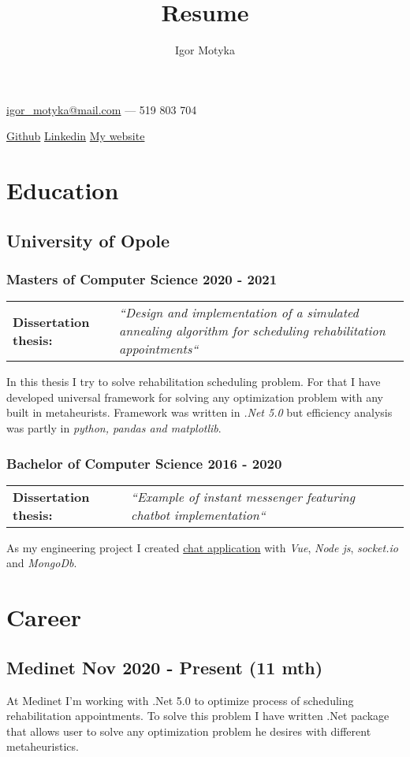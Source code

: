 \documentclass[10pt]{article}
\author{Igor Motyka}
\title{Resume}
\makeatletter
\renewcommand{\maketitle}{
 \begin{center}
    \huge\bfseries\theauthor
 \end{center}
 \begin{center}
    \href{mailto:igor_motyka@mail.com}{igor\_motyka@mail.com} --- 519 803 704 \\
 \end{center}
 \begin{center}
	 \href{https://github.com/Anav0}{Github} \hspace{0.7cm} \href{https://www.linkedin.com/in/igor-m-873439168/}{Linkedin} \hspace{0.7cm} \href{https://igormotyka.netlify.app/}{My website}
 \end{center}
 }
\makeatother
\begin{document}
\maketitle

\section{Education}
\subsection{University of Opole}
\subsubsection{Masters of Computer Science 2020 - 2021}
\begin{table}[H]
    \begin{tabularx}{\textwidth}{@{}l X}
     \textbf{Dissertation thesis:} & \textit{``Design and implementation of a simulated annealing algorithm for scheduling rehabilitation appointments``} \\
    \end{tabularx}
\end{table}
\noindent In this thesis I try to solve rehabilitation scheduling problem. For that I have developed universal framework for solving any optimization problem with any built in metaheurists. Framework was written in \emph{.Net 5.0} but efficiency analysis was partly in \emph{python, pandas and matplotlib}.
\subsubsection{Bachelor of Computer Science 2016 - 2020}
\begin{table}[H]
    \begin{tabularx}{\textwidth}{@{}l X}
    \textbf{Dissertation thesis:} &  \textit{``Example of instant messenger featuring chatbot implementation``}\\
    \end{tabularx}
\end{table}
\noindent As my engineering project I created \href{https://www.behance.net/gallery/91600605/Gymba-chat}{chat application} with \emph{Vue}, \emph{Node js}, \emph{socket.io} and \emph{MongoDb}.
\section{Career}
\subsection{Medinet Nov 2020 - Present (11 mth)}
At Medinet I'm working with .Net 5.0 to optimize process of scheduling rehabilitation appointments. To solve this problem I have written .Net package that allows user to solve any optimization problem he desires with different metaheuristics.
\end{document}
